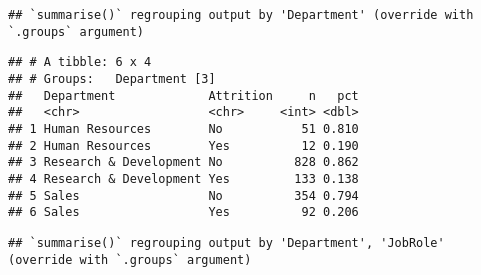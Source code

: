 \documentclass[
]{article}
\newenvironment{Shaded}{\begin{snugshade}}{\end{snugshade}}
\newcommand{\CommentTok}[1]{\textcolor[rgb]{0.56,0.35,0.01}{\textit{#1}}}
\newcommand{\DataTypeTok}[1]{\textcolor[rgb]{0.13,0.29,0.53}{#1}}
\newcommand{\KeywordTok}[1]{\textcolor[rgb]{0.13,0.29,0.53}{\textbf{#1}}}
\newcommand{\NormalTok}[1]{#1}
\newcommand{\OperatorTok}[1]{\textcolor[rgb]{0.81,0.36,0.00}{\textbf{#1}}}
\newcommand{\StringTok}[1]{\textcolor[rgb]{0.31,0.60,0.02}{#1}}
\begin{document}
\begin{verbatim}
## `summarise()` regrouping output by 'Department' (override with `.groups` argument)
\end{verbatim}

\begin{verbatim}
## # A tibble: 6 x 4
## # Groups:   Department [3]
##   Department             Attrition     n   pct
##   <chr>                  <chr>     <int> <dbl>
## 1 Human Resources        No           51 0.810
## 2 Human Resources        Yes          12 0.190
## 3 Research & Development No          828 0.862
## 4 Research & Development Yes         133 0.138
## 5 Sales                  No          354 0.794
## 6 Sales                  Yes          92 0.206
\end{verbatim}

\begin{Shaded}
\end{Shaded}

\begin{verbatim}
## `summarise()` regrouping output by 'Department', 'JobRole' (override with `.groups` argument)
\end{verbatim}
\end{document}
